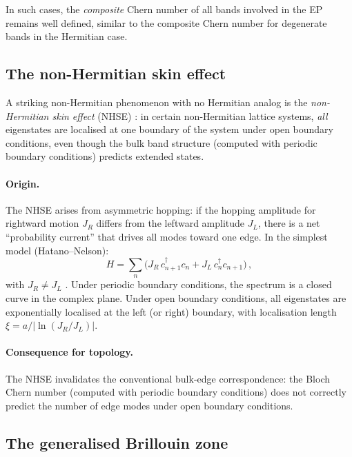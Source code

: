 In such cases, the \emph{composite} Chern number of all bands involved
in the EP remains well defined, similar to the composite Chern number
for degenerate bands in the Hermitian case.

\subsection{The non-Hermitian skin effect}
\label{sec:ch17-skin}

A striking non-Hermitian phenomenon with no Hermitian analog is the
\emph{non-Hermitian skin effect} (NHSE)
\cite{lee2016anomalous,price2022roadmap,yao2018edgea}: in certain non-Hermitian
lattice systems, \emph{all} eigenstates are localised at one boundary
of the system under open boundary conditions, even though the bulk band
structure (computed with periodic boundary conditions) predicts extended
states.

\paragraph{Origin.}
The NHSE arises from asymmetric hopping: if the hopping amplitude for
rightward motion $J_R$ differs from the leftward amplitude $J_L$, there
is a net ``probability current'' that drives all modes toward one edge.
In the simplest model (Hatano--Nelson):
\begin{equation}\label{eq:ch17-hatano-nelson}
  H = \sum_n\bigl(J_R\,c_{n+1}^\dagger c_n
  + J_L\,c_n^\dagger c_{n+1}\bigr)\,,
\end{equation}
with $J_R\neq J_L$
\cite{lin2023topological}.  Under periodic boundary conditions, the spectrum
is a closed curve in the complex plane.  Under open boundary conditions,
all eigenstates are exponentially localised at the left (or right)
boundary, with localisation length $\xi=a/|\ln(J_R/J_L)|$.

\paragraph{Consequence for topology.}
The NHSE invalidates the conventional bulk-edge correspondence:
the Bloch Chern number (computed with periodic boundary conditions)
does not correctly predict the number of edge modes under open
boundary conditions.

\subsection{The generalised Brillouin zone}
\label{sec:ch17-gbz}

